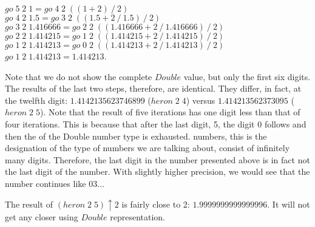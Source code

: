 \documentclass[tikz]{scrreprt}
\newcommand{\Conid}[1]{\mathit{#1}}
\newcommand{\Varid}[1]{\mathit{#1}}
\begin{document}
\begin{minipage}{\textwidth}
\ensuremath{\Varid{go}\;\mathrm{5}\;\mathrm{2}\;\mathrm{1}\mathrel{=}\Varid{go}\;\mathrm{4}\;\mathrm{2}\;((\mathrm{1}\mathbin{+}\mathrm{2})\mathbin{/}\mathrm{2})}\\
\ensuremath{\Varid{go}\;\mathrm{4}\;\mathrm{2}\;\mathrm{1.5}\mathrel{=}\Varid{go}\;\mathrm{3}\;\mathrm{2}\;((\mathrm{1.5}\mathbin{+}\mathrm{2}\mathbin{/}\mathrm{1.5})\mathbin{/}\mathrm{2})}\\
\ensuremath{\Varid{go}\;\mathrm{3}\;\mathrm{2}\;\mathrm{1.416666}\mathrel{=}\Varid{go}\;\mathrm{2}\;\mathrm{2}\;((\mathrm{1.416666}\mathbin{+}\mathrm{2}\mathbin{/}\mathrm{1.416666})\mathbin{/}\mathrm{2})}\\
\ensuremath{\Varid{go}\;\mathrm{2}\;\mathrm{2}\;\mathrm{1.414215}\mathrel{=}\Varid{go}\;\mathrm{1}\;\mathrm{2}\;((\mathrm{1.414215}\mathbin{+}\mathrm{2}\mathbin{/}\mathrm{1.414215})\mathbin{/}\mathrm{2})}\\
\ensuremath{\Varid{go}\;\mathrm{1}\;\mathrm{2}\;\mathrm{1.414213}\mathrel{=}\Varid{go}\;\mathrm{0}\;\mathrm{2}\;((\mathrm{1.414213}\mathbin{+}\mathrm{2}\mathbin{/}\mathrm{1.414213})\mathbin{/}\mathrm{2})}\\
\ensuremath{\Varid{go}\;\mathrm{1}\;\mathrm{2}\;\mathrm{1.414213}\mathrel{=}\mathrm{1.414213}}.
\end{minipage}

Note that we do not show the complete \ensuremath{\Conid{Double}} value,
but only the first six digits. The results of the last two
steps, therefore, are identical. They differ, in fact, at the
twelfth digit: 
$1.4142135623746899$ (\ensuremath{\Varid{heron}\;\mathrm{2}\;\mathrm{4}}) versus
$1.414213562373095$  (\ensuremath{\Varid{heron}\;\mathrm{2}\;\mathrm{5}}). 
Note that the result of five iterations has one digit less
than that of four iterations.
This is because that after the last digit, 5,
the digit 0 follows and then the  of 
the Double number type is exhausted.
 numbers, this is the designation of
the type of numbers we are talking about, 
consist of infinitely many digits. 
Therefore, the last digit in the number presented above
is in fact not the last digit of the number. 
With slightly higher precision, we would see that the number
continues like $03\dots$

The result of \ensuremath{(\Varid{heron}\;\mathrm{2}\;\mathrm{5})\mathbin{\uparrow}\mathrm{2}} is fairly close to 2: 
$1.9999999999999996$.
It will not get any closer using \ensuremath{\Conid{Double}} representation.
\end{document}
